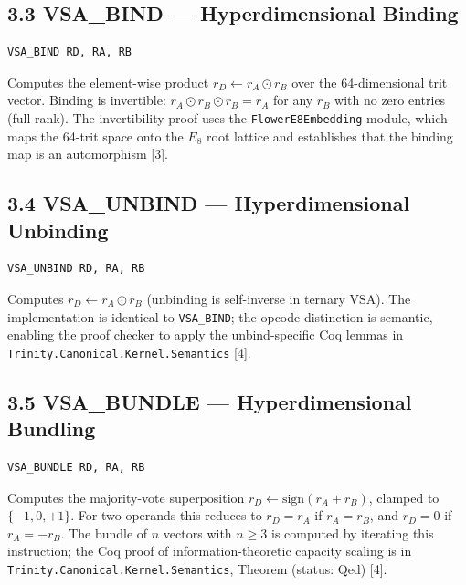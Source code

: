 \subsection{3.3 VSA\_BIND --- Hyperdimensional
Binding}\label{fa_26:vsa_bind-hyperdimensional-binding}

\begin{verbatim}
VSA_BIND RD, RA, RB
\end{verbatim}

Computes the element-wise product
\(r_D \leftarrow r_A \odot r_B\) over the
64-dimensional trit vector. Binding is invertible:
\(r_A \odot r_B \odot r_B = r_A\) for any \(r_B\)
with no zero entries (full-rank). The
invertibility proof uses the
\texttt{FlowerE8Embedding} module, which maps the
64-trit space onto the \(E_8\) root lattice and
establishes that the binding map is an
automorphism [3].

\subsection{3.4 VSA\_UNBIND ---
Hyperdimensional
Unbinding}\label{fa_26:vsa_unbind-hyperdimensional-unbinding}

\begin{verbatim}
VSA_UNBIND RD, RA, RB
\end{verbatim}

Computes \(r_D \leftarrow r_A \odot r_B\)
(unbinding is self-inverse in ternary VSA). The
implementation is identical to \texttt{VSA\_BIND};
the opcode distinction is semantic, enabling the
proof checker to apply the unbind-specific Coq
lemmas in
\texttt{Trinity.Canonical.Kernel.Semantics}
[4].

\subsection{3.5 VSA\_BUNDLE ---
Hyperdimensional
Bundling}\label{fa_26:vsa_bundle-hyperdimensional-bundling}

\begin{verbatim}
VSA_BUNDLE RD, RA, RB
\end{verbatim}

Computes the majority-vote superposition
\(r_D \leftarrow \text{sign}(r_A + r_B)\), clamped
to \(\{-1, 0, +1\}\). For two operands this
reduces to \(r_D = r_A\) if \(r_A = r_B\), and
\(r_D = 0\) if \(r_A = -r_B\). The bundle of \(n\)
vectors with \(n \geq 3\) is computed by iterating
this instruction; the Coq proof of
information-theoretic capacity scaling is in
\texttt{Trinity.Canonical.Kernel.Semantics},
Theorem 
(status: Qed) [4].

